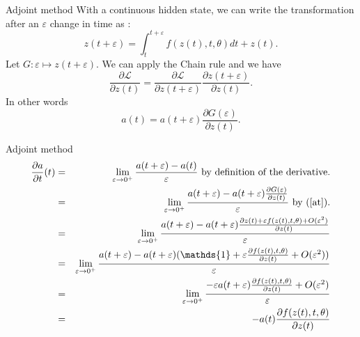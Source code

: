 \documentclass[11pt]{beamer}
\begin{document}
\begin{frame}{Adjoint method}
With a continuous hidden state, we can write the transformation after an $\varepsilon$ change in time as :
\begin{equation}
\label{zteps}
z(t+\varepsilon) = \int^{t+\varepsilon}_{t} f(z(t),t,\theta) dt + z(t).
\end{equation}
Let $ G : \varepsilon \mapsto z(t+\varepsilon)$. We can apply the Chain rule and we have 
\begin{equation*}
\frac{\partial \mathcal{L}}{\partial z(t)} = \frac{\partial \mathcal{L}}{\partial z(t+\varepsilon)} \frac{\partial z(t+\varepsilon)}{\partial z(t)}.
\end{equation*}
In other words 
\begin{equation}
\label{at}
a(t) = a(t+\varepsilon)\frac{\partial G(\varepsilon)}{\partial z(t)}.
\end{equation}
\end{frame}

\begin{frame}{Adjoint method}
\begin{eqnarray*}
\frac{\partial a}{\partial t}(t) &=& \lim_{\varepsilon \rightarrow 0^+} \frac{a(t+\varepsilon) - a(t)}{\varepsilon} \text{ by definition of the derivative.}\\
&=& \lim_{\varepsilon \rightarrow 0^+} \frac{a(t+\varepsilon) - a(t+\varepsilon)\frac{\partial G(\varepsilon)}{\partial z(t)}}{\varepsilon} \text{ by (\ref{at}).}\\
&=& \lim_{\varepsilon \rightarrow 0^+} \frac{a(t+\varepsilon) - a(t+\varepsilon)\frac{\partial z(t) + \varepsilon f(z(t),t,\theta) + O(\varepsilon^2)}{\partial z(t)}}{\varepsilon} \\
&=& \lim_{\varepsilon \rightarrow 0^+} \frac{a(t+\varepsilon) - a(t+\varepsilon)(\mathds{1} + \varepsilon \frac{\partial f(z(t),t,\theta)} {\partial z(t)}+ O(\varepsilon^2))}{\varepsilon}\\
&=& \lim_{\varepsilon \rightarrow 0^+} \frac{-\varepsilon a(t+\varepsilon) \frac{\partial f(z(t),t,\theta)} {\partial z(t)}+ O(\varepsilon^2)}{\varepsilon}\\
&=& -a(t)\frac{\partial f(z(t),t,\theta)} {\partial z(t)}
\end{eqnarray*}
\end{frame}
\end{document}
